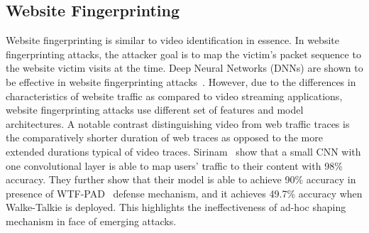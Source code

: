 \subsection{Website Fingerprinting}
Website fingerprinting is similar to video identification in essence.
In website fingerprinting attacks, the attacker goal is to map the victim's packet sequence to the website victim visits at the time. 
Deep Neural Networks (DNNs) are shown to be effective in website fingerprinting attacks~\cite{sirinam2018df}.
However, due to the differences in characteristics of website traffic as compared to video streaming applications, website fingerprinting attacks use different set of features and model architectures. 
A notable contrast distinguishing video from web traffic traces is the comparatively shorter duration of web traces as opposed to the more extended durations typical of video traces.
Sirinam~ show that a small CNN with one convolutional layer is able to map users' traffic to their content with 98\% accuracy.
They further show that their model is able to achieve 90\% accuracy in presence of WTF-PAD~\cite{juarez2016wtfpad} defense mechanism, and it achieves 49.7\% accuracy when Walke-Talkie is deployed.
This highlights the ineffectiveness of ad-hoc shaping mechanism in face of emerging attacks.

